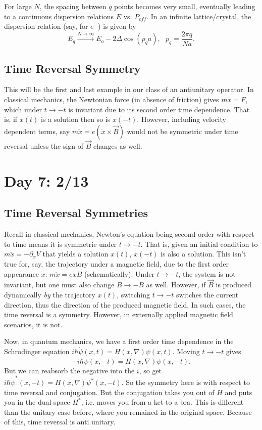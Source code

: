 \documentclass[fontsize=12pt]{scrartcl}
\newcommand{\ptl}{\partial}
\begin{document}
For large $N$, the spacing between $q$ points becomes very small, eventually leading to a continuous dispersion relations $E$ vs. $P_{eff}$. In an infinite lattice/crystal, the dispersion relation (say, for $e^-$) is given by $$E_q\overset{N\to\infty}{\to}E_o-2\Delta\cos(p_qa), \ \ \ p_q=\frac{2\pi q}{Na}.$$

\subsection{Time Reversal Symmetry}

This will be the first and last example in our class of an antiunitary operator. In classical mechanics, the Newtonian force (in absence of friction) gives $m\ddot{x}=F$, which under $t\to-t$ is invariant due to its second order time dependence. That is, if $x(t)$ is a solution then so is $x(-t)$. However, including velocity dependent terms, say $m\ddot{x}=e(\dot{x}\times \vec{B})$ would not be symmetric under time reversal unless the sign of $\vec{B}$ changes as well.



\section{Day 7: 2/13}

\subsection{Time Reversal Symmetries}

Recall in classical mechanics, Newton's equation being second order with respect to time means it is symmetric under $t\to -t$. That is, given an initial condition to $m\ddot{x}=-\ptl_xV$ that yields a solution $x(t)$, $x(-t)$ is also a solution. This isn't true for, say, the trajectory under a magnetic field, due to the first order appearance $\dot{x}$: $m\ddot{x}=e\dot{x}B$ (schematically). Under $t\to -t$, the system is not invariant, but one must also change $B\to-B$ as well. However, if $\vec{B}$ is produced dynamically \textit{by} the trajectory $x(t)$, switching $t\to -t$ switches the current direction, thus the direction of the produced magnetic field. In such cases, the time reversal is a symmetry. However, in externally applied magnetic field scenarios, it is not.

Now, in quantum mechanics, we have a first order time dependence in the Schrodinger equation $i\hbar \dot{\psi}(x,t)=H(x,\nabla)\psi(x,t)$. Moving $t\to -t$ gives $$-i\hbar \dot{\psi}(x, -t)=H(x,\nabla)\psi(x,-t).$$ But we can reabsorb the negative into the $i$, so get $i\hbar\dot{\psi}^*(x,-t)=H(x,\nabla)\psi^*(x,-t).$ So the symmetry here is with respect to time reversal and conjugation. But the conjugation takes you out of $H$ and puts you in the dual space $H^*$, i.e. moves you from a ket to a bra. This is different than the unitary case before, where you remained in the original space. Because of this, time reversal is anti unitary.
\end{document}
